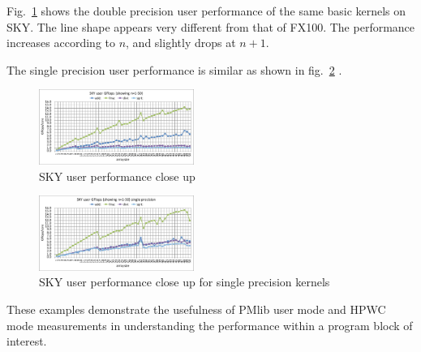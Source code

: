 \documentclass[conference]{IEEEtran}
\begin{document}
Fig.~\ref{fig:sky-user-short-R8}
shows the double precision user performance of the same basic kernels on SKY.
The line shape appears very different from that of FX100.
The performance increases according to $ n $, and slightly drops
at $ n+1 $.



The single precision user performance is similar as shown in
fig.~\ref{fig:sky-user-short-R4} .


\begin{figure}[tb]
\centering
\includegraphics[width=0.45\textwidth]{figs/sky-user-short-R8.pdf}
\caption{SKY user performance close up}
\label{fig:sky-user-short-R8}
\end{figure}
\begin{figure}[tb]
\centering
\includegraphics[width=0.45\textwidth]{figs/sky-user-short-R4.pdf}
\caption{SKY user performance close up for single precision kernels}
\label{fig:sky-user-short-R4}
\end{figure}


These examples demonstrate the usefulness of PMlib user mode
and HPWC mode measurements in understanding the performance
within a program block of interest.
\end{document}
